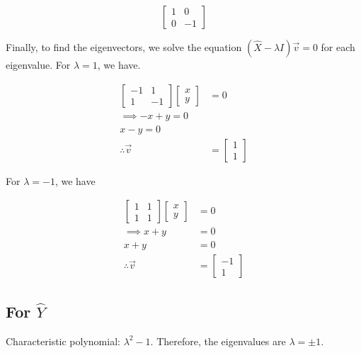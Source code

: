 \documentclass[12pt,a4paper]{article}
\begin{document}
			\begin{equation*}
				\begin{bmatrix} 1 & 0 \\ 0 & -1\end{bmatrix}
			\end{equation*}

			Finally, to find the eigenvectors, we solve the equation $(\hat{X} - \lambda I)\vec{v} = 0$ for each eigenvalue. For $\lambda = 1$, we have.

			\begin{align*}
				\begin{bmatrix}
					-1 & 1 \\ 
					1 & -1
				\end{bmatrix}
				\begin{bmatrix}
					x \\
					y
				\end{bmatrix}
				&= 0 \\
				\implies - x + y = 0 \\
				x - y = 0 \\
				\therefore \vec{v} &= \begin{bmatrix} 1 \\ 1\end{bmatrix}
			\end{align*}

			For $\lambda = -1$, we have

			\begin{align*}
				\begin{bmatrix}
					1 & 1 \\ 
					1 & 1
				\end{bmatrix}
				\begin{bmatrix}
					x \\
					y
				\end{bmatrix}
				&= 0 \\
				\implies x + y &= 0 \\
				x + y &= 0 \\
				\therefore \vec{v} &= \begin{bmatrix} -1 \\ 1\end{bmatrix}
			\end{align*}

		\subsection{For $\hat{Y}$}
			Characteristic polynomial: $\lambda^2 - 1$. Therefore, the eigenvalues are $\lambda = \pm 1$.
\end{document}
